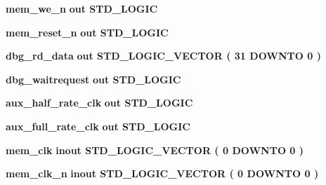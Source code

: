 \begin{DoxyCompactItemize}
\item 
{\bf mem\+\_\+we\+\_\+n}  {\bfseries {\bfseries \textcolor{keywordflow}{out}\textcolor{vhdlchar}{ }}} {\bfseries \textcolor{comment}{S\+T\+D\+\_\+\+L\+O\+G\+IC}\textcolor{vhdlchar}{ }} 
\item 
{\bf mem\+\_\+reset\+\_\+n}  {\bfseries {\bfseries \textcolor{keywordflow}{out}\textcolor{vhdlchar}{ }}} {\bfseries \textcolor{comment}{S\+T\+D\+\_\+\+L\+O\+G\+IC}\textcolor{vhdlchar}{ }} 
\item 
{\bf dbg\+\_\+rd\+\_\+data}  {\bfseries {\bfseries \textcolor{keywordflow}{out}\textcolor{vhdlchar}{ }}} {\bfseries \textcolor{comment}{S\+T\+D\+\_\+\+L\+O\+G\+I\+C\+\_\+\+V\+E\+C\+T\+OR}\textcolor{vhdlchar}{ }\textcolor{vhdlchar}{(}\textcolor{vhdlchar}{ }\textcolor{vhdlchar}{ } \textcolor{vhdldigit}{31} \textcolor{vhdlchar}{ }\textcolor{keywordflow}{D\+O\+W\+N\+TO}\textcolor{vhdlchar}{ }\textcolor{vhdlchar}{ } \textcolor{vhdldigit}{0} \textcolor{vhdlchar}{ }\textcolor{vhdlchar}{)}\textcolor{vhdlchar}{ }} 
\item 
{\bf dbg\+\_\+waitrequest}  {\bfseries {\bfseries \textcolor{keywordflow}{out}\textcolor{vhdlchar}{ }}} {\bfseries \textcolor{comment}{S\+T\+D\+\_\+\+L\+O\+G\+IC}\textcolor{vhdlchar}{ }} 
\item 
{\bf aux\+\_\+half\+\_\+rate\+\_\+clk}  {\bfseries {\bfseries \textcolor{keywordflow}{out}\textcolor{vhdlchar}{ }}} {\bfseries \textcolor{comment}{S\+T\+D\+\_\+\+L\+O\+G\+IC}\textcolor{vhdlchar}{ }} 
\item 
{\bf aux\+\_\+full\+\_\+rate\+\_\+clk}  {\bfseries {\bfseries \textcolor{keywordflow}{out}\textcolor{vhdlchar}{ }}} {\bfseries \textcolor{comment}{S\+T\+D\+\_\+\+L\+O\+G\+IC}\textcolor{vhdlchar}{ }} 
\item 
{\bf mem\+\_\+clk}  {\bfseries {\bfseries \textcolor{keywordflow}{inout}\textcolor{vhdlchar}{ }}} {\bfseries \textcolor{comment}{S\+T\+D\+\_\+\+L\+O\+G\+I\+C\+\_\+\+V\+E\+C\+T\+OR}\textcolor{vhdlchar}{ }\textcolor{vhdlchar}{(}\textcolor{vhdlchar}{ }\textcolor{vhdlchar}{ } \textcolor{vhdldigit}{0} \textcolor{vhdlchar}{ }\textcolor{keywordflow}{D\+O\+W\+N\+TO}\textcolor{vhdlchar}{ }\textcolor{vhdlchar}{ } \textcolor{vhdldigit}{0} \textcolor{vhdlchar}{ }\textcolor{vhdlchar}{)}\textcolor{vhdlchar}{ }} 
\item 
{\bf mem\+\_\+clk\+\_\+n}  {\bfseries {\bfseries \textcolor{keywordflow}{inout}\textcolor{vhdlchar}{ }}} {\bfseries \textcolor{comment}{S\+T\+D\+\_\+\+L\+O\+G\+I\+C\+\_\+\+V\+E\+C\+T\+OR}\textcolor{vhdlchar}{ }\textcolor{vhdlchar}{(}\textcolor{vhdlchar}{ }\textcolor{vhdlchar}{ } \textcolor{vhdldigit}{0} \textcolor{vhdlchar}{ }\textcolor{keywordflow}{D\+O\+W\+N\+TO}\textcolor{vhdlchar}{ }\textcolor{vhdlchar}{ } \textcolor{vhdldigit}{0} \textcolor{vhdlchar}{ }\textcolor{vhdlchar}{)}\textcolor{vhdlchar}{ }} 

\end{DoxyCompactItemize}
